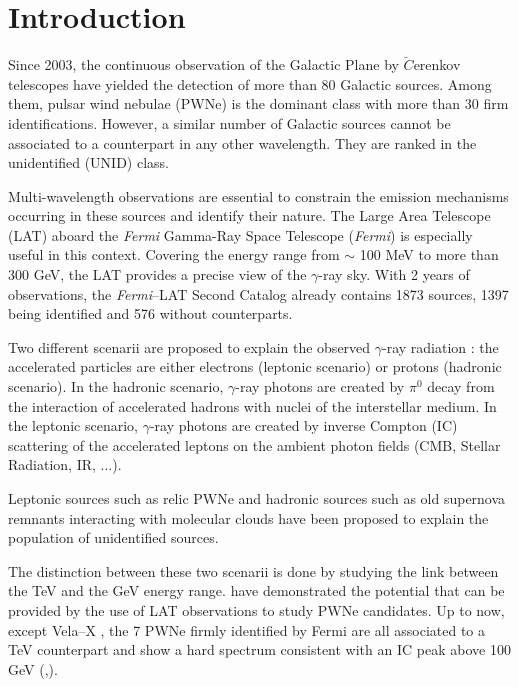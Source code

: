 \section{Introduction}

Since 2003, the continuous observation of the Galactic Plane by $\breve{C}$erenkov telescopes have yielded the detection of more than 80 Galactic sources. Among them, pulsar wind nebulae (PWNe) is the dominant class with more than 30 firm identifications. However, a similar number of Galactic sources cannot be associated to a counterpart in any other wavelength. They are ranked in the unidentified (UNID) class.

Multi-wavelength observations are essential to constrain the emission mechanisms occurring in these sources and identify their nature. The Large Area Telescope (LAT) aboard the \emph{Fermi} Gamma-Ray Space Telescope (\emph{Fermi}) is especially useful in this context. Covering the energy range from $\sim$ 100 MeV to more than 300 GeV, the LAT provides a precise view of the $\gamma$-ray sky. With 2 years of observations, the \emph{Fermi}--LAT Second Catalog \citep{2012ApJS..199...31N} already contains 1873 sources, 1397 being identified and 576 without counterparts.

Two different scenarii are proposed to explain the observed $\gamma$-ray radiation : the accelerated particles are either electrons (leptonic scenario) or protons (hadronic scenario). In the hadronic scenario, $\gamma$-ray photons are created by $\pi^0$ decay from the interaction of accelerated hadrons with nuclei of the interstellar medium. In the leptonic scenario, $\gamma$-ray photons are created by inverse Compton (IC) scattering of the accelerated leptons on the ambient photon fields (CMB, Stellar Radiation, IR, ...).

Leptonic sources such as relic PWNe \citep{2009ASSL..357..451D,2009arXiv0906.2644D} and hadronic sources such as old supernova remnants interacting with molecular clouds \citep{2011arXiv1104.1197U} have been proposed to explain the population of unidentified sources.

The distinction between these two scenarii is done by studying the link between the TeV and the GeV energy range. \cite{2010ApJ...720..266S,2011ApJ...738...42G,Rousseau1857} have demonstrated the potential that can be provided by the use of LAT observations to study PWNe candidates. Up to now, except Vela--X \citep{2010ApJ...713..146A}, the 7 PWNe firmly identified by Fermi are all associated to a TeV counterpart and show a hard spectrum consistent with an IC peak above 100 GeV (\cite{2010ApJ...708.1254A},\cite{2011ApJ...738...42G}).


